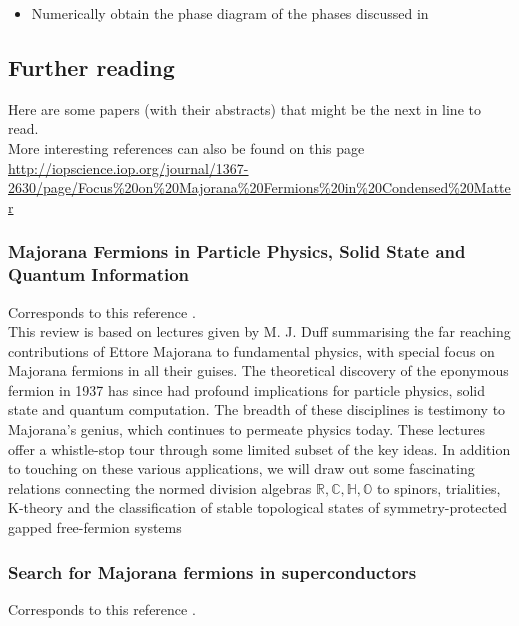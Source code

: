\begin{itemize}
    \item Numerically obtain the phase diagram of the phases discussed in \cite{2001kitaev}
\end{itemize}

\subsection{Further reading}

Here are some papers (with their abstracts) that might be the next in line to read. \\

More interesting references can also be found on this page \url{http://iopscience.iop.org/journal/1367-2630/page/Focus\%20on\%20Majorana\%20Fermions\%20in\%20Condensed\%20Matter}


\subsubsection{Majorana Fermions in Particle Physics, Solid
State and Quantum Information}

Corresponds to this reference \cite{2016Borsten}.\\

This review is based on lectures given by M. J. Duff summarising the far reaching contributions of Ettore Majorana to fundamental physics, with special focus on Majorana fermions in all their guises. The theoretical discovery of the eponymous fermion in 1937 has since had profound implications for particle physics, solid state and quantum computation. The breadth of these disciplines is testimony to Majorana's genius, which continues to permeate physics today. These lectures offer a whistle-stop tour through some limited subset of the key ideas. In addition to touching on these various applications, we will draw out some fascinating relations connecting the normed division algebras $\mathbb{R},\mathbb{C},\mathbb{H},\mathbb{O}$ to spinors, trialities, K-theory and the classification of stable topological states of symmetry-protected gapped free-fermion systems


\subsubsection{Search for Majorana fermions in superconductors}

Corresponds to this reference \cite{2012Beenakker}.\\

